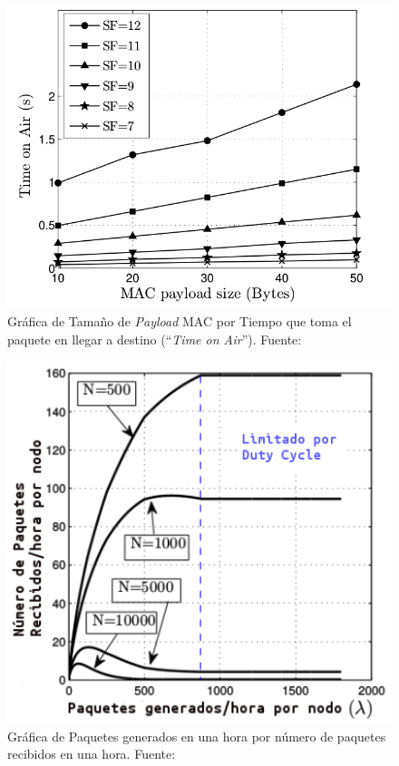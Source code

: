 \begin{justify}
\begin{figure}[!b]
\centering
\includegraphics[scale=0.4]{images/estadoarte1.png}
\caption{Gráfica de Tamaño de \textit{Payload} MAC por Tiempo que toma el paquete en llegar a destino (``\textit{Time on Air}''). Fuente:\cite{Xavier}}
\label{arte:1}
\end{figure}
\begin{figure}[!ht]
\centering
\includegraphics[scale=0.5]{images/estadoarte2.png}
\caption{Gráfica de Paquetes generados en una hora por número de paquetes recibidos en una hora. Fuente:\cite{Xavier}}
\label{arte:2}
\end{figure}

\end{justify}
